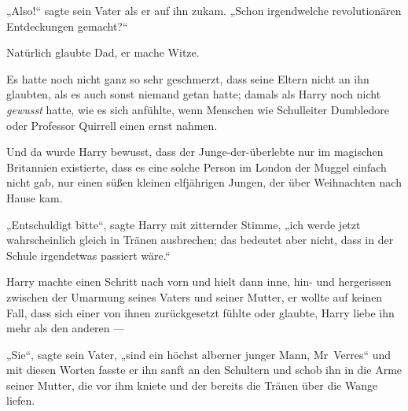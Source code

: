 „Also!“ sagte sein Vater als er auf ihn zukam.
„Schon irgendwelche revolutionären Entdeckungen gemacht?“

Natürlich glaubte Dad, er mache Witze.

Es hatte noch nicht ganz so sehr geschmerzt, dass seine Eltern nicht an ihn glaubten, als es auch sonst niemand getan hatte; damals als Harry noch nicht \emph{gewusst} hatte, wie es sich anfühlte, wenn Menschen wie Schulleiter Dumbledore oder Professor Quirrell einen ernst nahmen.

Und da wurde Harry bewusst, dass der Junge-der-überlebte nur im magischen Britannien existierte, dass es eine solche Person im London der Muggel einfach nicht gab, nur einen süßen kleinen elfjährigen Jungen, der über Weihnachten nach Hause kam.

„Entschuldigt bitte“, sagte Harry mit zitternder Stimme, „ich werde jetzt wahrscheinlich gleich in Tränen ausbrechen; das bedeutet aber nicht, dass in der Schule irgendetwas passiert wäre.“

Harry machte einen Schritt nach vorn und hielt dann inne, hin- und hergerissen zwischen der Umarmung seines Vaters und seiner Mutter, er wollte auf keinen Fall, dass sich einer von ihnen zurückgesetzt fühlte oder glaubte, Harry liebe ihn mehr als den anderen —

„Sie“, sagte sein Vater, „sind ein höchst alberner junger Mann, Mr~Verres“ und mit diesen Worten fasste er ihn sanft an den Schultern und schob ihn in die Arme seiner Mutter, die vor ihm kniete und der bereits die Tränen über die Wange liefen.

